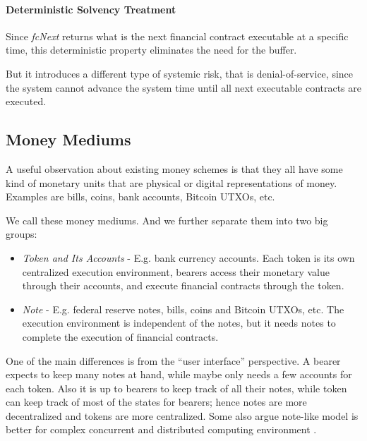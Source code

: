 \documentclass[a4paper,10pt]{report}
\begin{document}
\paragraph{Deterministic Solvency Treatment}

Since \textit{fcNext} returns what is the next financial contract executable at a specific time, this deterministic
property eliminates the need for the buffer.

But it introduces a different type of systemic risk, that is denial-of-service, since the system cannot advance the
system time until all next executable contracts are executed.


\subsection{Money Mediums}

\begin{displayquote}
A useful observation about existing money schemes is that they all have some kind of monetary units that are physical or
digital representations of money. Examples are bills, coins, bank accounts, Bitcoin UTXOs,
etc. 
\end{displayquote}

We call these money mediums. And we further separate them into two big groups:

\begin{itemize}
\item \textit{Token and Its Accounts} - E.g. bank currency accounts. Each token is its own centralized execution
    environment, bearers access their monetary value through their accounts, and execute financial contracts through the
    token.
\item \textit{Note} - E.g. federal reserve notes, bills, coins and Bitcoin UTXOs, etc. The execution environment is
    independent of the notes, but it needs notes to complete the execution of financial contracts.
\end{itemize}

One of the main differences is from the ``user interface'' perspective. A bearer expects to keep many notes at hand,
while maybe only needs a few accounts for each token. Also it is up to bearers to keep track of all their notes, while
token can keep track of most of the states for bearers; hence notes are more decentralized and tokens are more
centralized. Some also argue note-like model is better for complex concurrent and distributed computing environment
.
\end{document}
